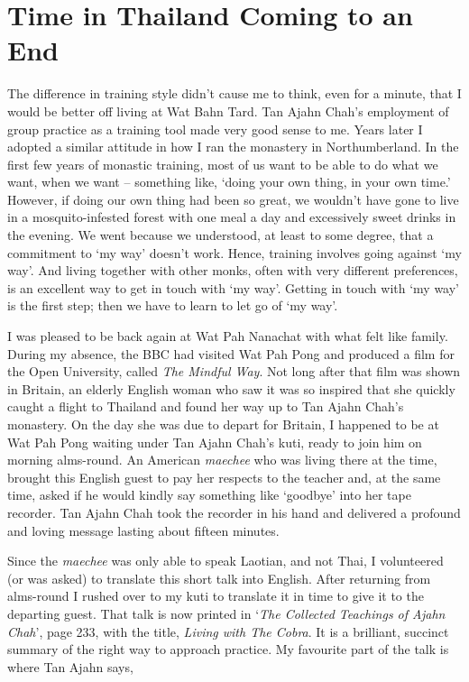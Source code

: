 \chapter{Time in Thailand Coming to an End}

The difference in training style didn't cause me to think, even for a
minute, that I would be better off living at Wat Bahn Tard. Tan Ajahn
Chah's employment of group practice as a training tool made very good
sense to me. Years later I adopted a similar attitude in how I ran the
monastery in Northumberland. In the first few years of monastic
training, most of us want to be able to do what we want, when we want --
something like, `doing your own thing, in your own time.' However, if
doing our own thing had been so great, we wouldn't have gone to live in
a mosquito-infested forest with one meal a day and excessively sweet
drinks in the evening. We went because we understood, at least to some
degree, that a commitment to `my way' doesn't work. Hence, training
involves going against `my way'. And living together with other monks,
often with very different preferences, is an excellent way to get in
touch with `my way'. Getting in touch with `my way' is the first step;
then we have to learn to let go of `my way'.

I was pleased to be back again at Wat Pah Nanachat with what felt like
family. During my absence, the BBC had visited Wat Pah Pong and produced
a film for the Open University, called \emph{The Mindful Way}. Not long
after that film was shown in Britain, an elderly English woman who saw
it was so inspired that she quickly caught a flight to Thailand and
found her way up to Tan Ajahn Chah's monastery. On the day she was due
to depart for Britain, I happened to be at Wat Pah Pong waiting under
Tan Ajahn Chah's kuti, ready to join him on morning alms-round. An
American \emph{maechee} who was living there at the time, brought this
English guest to pay her respects to the teacher and, at the same time,
asked if he would kindly say something like `goodbye' into her tape
recorder. Tan Ajahn Chah took the recorder in his hand and delivered a
profound and loving message lasting about fifteen minutes.

Since the \emph{maechee} was only able to speak Laotian, and not Thai, I
volunteered (or was asked) to translate this short talk into English.
After returning from alms-round I rushed over to my kuti to translate it
in time to give it to the departing guest. That talk is now printed in
`\emph{The Collected Teachings of Ajahn Chah}\cite{collected}',
page 233, with the title,
\emph{Living with The Cobra}. It is a brilliant, succinct summary of the
right way to approach practice. My favourite part of the talk is where
Tan Ajahn says,

